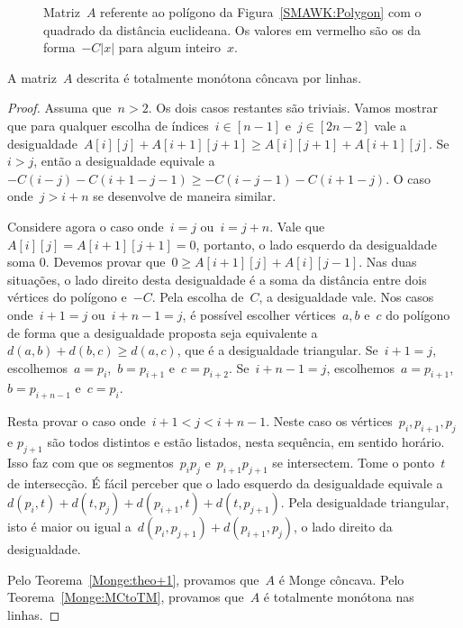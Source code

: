 \begin{figure}[h]
    \centering
    
    \caption{Matriz~$A$ referente ao polígono da Figura~\ref{SMAWK:Polygon} com o quadrado da distância euclideana. Os valores em vermelho são os da forma~$-C|x|$ para algum inteiro~$x$.}
\end{figure}

\begin{prop}
A matriz~$A$ descrita é totalmente monótona côncava por linhas.
\end{prop}

\begin{proof}
Assuma que~$n > 2$. Os dois casos restantes são triviais. Vamos mostrar que para qualquer escolha de índices~${ i \in [n-1] }$ e~${ j \in [2n-2] }$ vale a desigualdade~${ A[i][j] + A[i+1][j+1] \geq A[i][j+1] + A[i+1][j] }$. Se~$i > j$, então a desigualdade equivale a~${ -C(i - j) - C(i + 1 - j - 1) \geq -C(i - j - 1) - C(i + 1 - j) }$. O caso onde~${ j > i + n} $ se desenvolve de maneira similar.

Considere agora o caso onde~$i = j$ ou~$i = j + n$. Vale que~$A[i][j] = A[i+1][j+1] = 0$, portanto, o lado esquerdo da desigualdade soma 0. Devemos provar que~$0 \geq A[i+1][j] + A[i][j-1]$. Nas duas situações, o lado direito desta desigualdade é a soma da distância entre dois vértices do polígono e~$-C$. Pela escolha de~$C$, a desigualdade vale. Nos casos onde~$i + 1 = j$ ou~$i + n - 1 = j$, é possível escolher vértices~$a,b$ e~$c$ do polígono de forma que a desigualdade proposta seja equivalente a~$d(a,b) + d(b,c) \geq d(a,c)$, que é a desigualdade triangular. Se~$i+1 = j$, escolhemos~$a = p_i$,~$b = p_{i+1}$ e~$c = p_{i+2}$. Se~$i+n-1 = j$, escolhemos~$a = p_{i+1}$,~$b = p_{i+n-1}$ e~$c = p_{i}$.

Resta provar o caso onde~$i + 1 < j < i + n - 1$. Neste caso os vértices~$p_i,p_{i+1},p_j$ e $p_{j+1}$ são todos distintos e estão listados, nesta sequência, em sentido horário. Isso faz com que os segmentos~$p_ip_j$ e~$p_{i+1}p_{j+1}$ se intersectem. Tome o ponto~$t$ de intersecção. É fácil perceber que o lado esquerdo da desigualdade equivale a~$d(p_i,t) + d(t,p_j) + d(p_{i+1},t) + d(t,p_{j+1})$. Pela desigualdade triangular, isto é maior ou igual a~$d(p_i,p_{j+1}) + d(p_{i+1},p_j)$, o lado direito da desigualdade.

Pelo Teorema~\ref{Monge:theo+1}, provamos que~$A$ é Monge côncava. Pelo Teorema~\ref{Monge:MCtoTM}, provamos que~$A$ é totalmente monótona nas linhas.
\end{proof}

